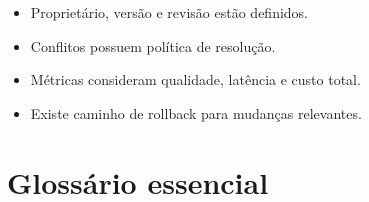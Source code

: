 \documentclass[
  10pt,
  a4paper,
  oneside]{book}
\providecommand{\tightlist}{%
  \setlength{\itemsep}{0pt}\setlength{\parskip}{0pt}}
\begin{document}
\begin{itemize}
\tightlist
\item[$\square$]
  Proprietário, versão e revisão estão definidos.
\item[$\square$]
  Conflitos possuem política de resolução.
\item[$\square$]
  Métricas consideram qualidade, latência e custo total.
\item[$\square$]
  Existe caminho de rollback para mudanças relevantes.
\end{itemize}

\normalsize

\newpage

\hypertarget{glossuxe1rio-essencial}{%
\chapter{Glossário essencial}\label{glossuxe1rio-essencial}}

\footnotesize
\end{document}
